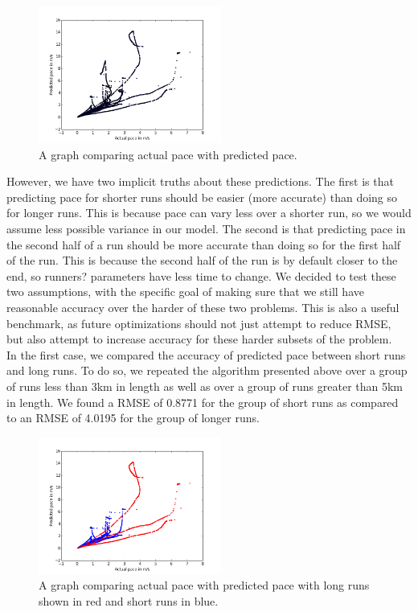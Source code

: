 \documentclass[twoside]{article}
\begin{document}
\begin{multicols}{2}
\begin{figure}[H]
\begin{center}
\includegraphics[width=6cm]{all.png}
\caption{A graph comparing actual pace with predicted pace. }
\end{center}
\end{figure}

However, we have two implicit truths about these predictions. The first is that predicting pace for shorter runs should be easier (more accurate) than doing so for longer runs. This is because pace can vary less over a shorter run, so we would assume less possible variance in our model. The second is that predicting pace in the second half of a run should be more accurate than doing so for the first half of the run. This is because the second half of the run is by default closer to the end, so runners? parameters have less time to change. We decided to test these two assumptions, with the specific goal of making sure that we still have reasonable accuracy over the harder of these two problems. This is also a useful benchmark, as future optimizations should not just attempt to reduce RMSE, but also attempt to increase accuracy for these harder subsets of the problem.\\
 
In the first case, we compared the accuracy of predicted pace between short runs and long runs. To do so, we repeated the algorithm presented above over a group of runs less than 3km in length as well as over a group of runs greater than 5km in length. We found a RMSE of 0.8771  for the group of short runs as compared to an RMSE of 4.0195 for the group of longer runs.

\begin{figure}[H]
\begin{center}
\includegraphics[width=6cm]{longshort.png}
\caption{A graph comparing actual pace with predicted pace with long runs shown in red and short runs in blue. }
\end{center}
\end{figure}
 

\end{multicols}
\end{document}
